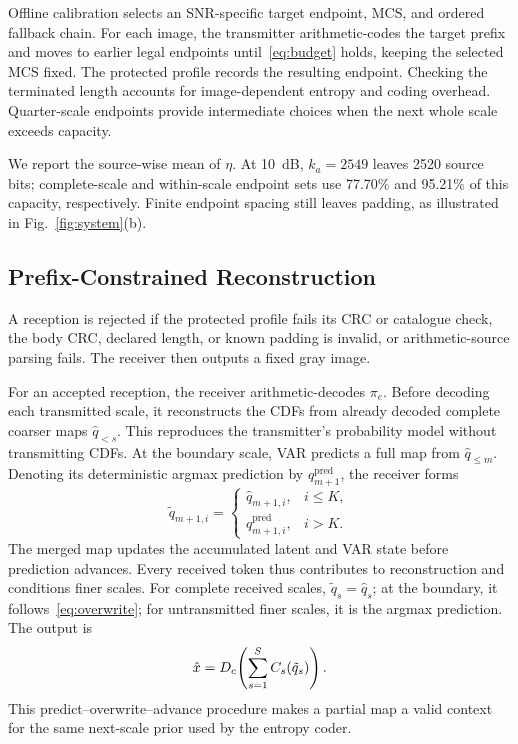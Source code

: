 Offline calibration selects an SNR-specific target endpoint, MCS, and ordered fallback chain. For each image, the transmitter arithmetic-codes the target prefix and moves to earlier legal endpoints until~\eqref{eq:budget} holds, keeping the selected MCS fixed. The protected profile records the resulting endpoint. Checking the terminated length accounts for image-dependent entropy and coding overhead. Quarter-scale endpoints provide intermediate choices when the next whole scale exceeds capacity.

We report the source-wise mean of $\eta$. At 10~dB, $k_a=2549$ leaves 2520 source bits; complete-scale and within-scale endpoint sets use 77.70\% and 95.21\% of this capacity, respectively. Finite endpoint spacing still leaves padding, as illustrated in Fig.~\ref{fig:system}(b).

\subsection{Prefix-Constrained Reconstruction}
A reception is rejected if the protected profile fails its CRC or catalogue check, the body CRC, declared length, or known padding is invalid, or arithmetic-source parsing fails. The receiver then outputs a fixed gray image.

For an accepted reception, the receiver arithmetic-decodes $\pi_e$. Before decoding each transmitted scale, it reconstructs the CDFs from already decoded complete coarser maps $\hat q_{<s}$. This reproduces the transmitter's probability model without transmitting CDFs. At the boundary scale, VAR predicts a full map from $\hat q_{\leq m}$. Denoting its deterministic argmax prediction by $q^{\mathrm{pred}}_{m+1}$, the receiver forms
\begin{equation}
 \tilde q_{m+1,i}=\begin{cases}
 \hat q_{m+1,i},&i\leq K,\\
 q^{\mathrm{pred}}_{m+1,i},&i>K.
 \end{cases}
 \label{eq:overwrite}
\end{equation}
The merged map updates the accumulated latent and VAR state before prediction advances. Every received token thus contributes to reconstruction and conditions finer scales. For complete received scales, $\tilde q_s=\hat q_s$; at the boundary, it follows~\eqref{eq:overwrite}; for untransmitted finer scales, it is the argmax prediction. The output is
\begin{equation}
 \hat x=D_c\!\left(\sum_{s=1}^S C_s(\tilde q_s)\right).
 \label{eq:reconstruction}
\end{equation}
This predict--overwrite--advance procedure makes a partial map a valid context for the same next-scale prior used by the entropy coder.
